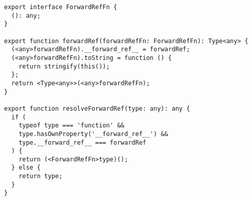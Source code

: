 \begin{verbatim}
export interface ForwardRefFn {
  (): any;
}

export function forwardRef(forwardRefFn: ForwardRefFn): Type<any> {
  (<any>forwardRefFn).__forward_ref__ = forwardRef;
  (<any>forwardRefFn).toString = function () {
    return stringify(this());
  };
  return <Type<any>>(<any>forwardRefFn);
}

export function resolveForwardRef(type: any): any {
  if (
    typeof type === 'function' &&
    type.hasOwnProperty('__forward_ref__') &&
    type.__forward_ref__ === forwardRef
  ) {
    return (<ForwardRefFn>type)();
  } else {
    return type;
  }
}
\end{verbatim}
